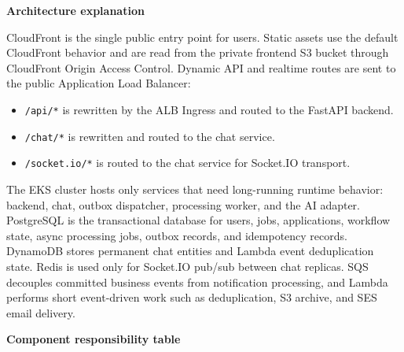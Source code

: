 \vspace{0.5em}\noindent\textbf{Architecture explanation}\par

CloudFront is the single public entry point for users. Static assets use
the default CloudFront behavior and are read from the private frontend
S3 bucket through CloudFront Origin Access Control. Dynamic API and
realtime routes are sent to the public Application Load Balancer:

\begin{itemize}
\tightlist
\item
  \texttt{/\allowbreak{}api/\allowbreak{}*} is rewritten by the ALB Ingress and routed to the
  FastAPI backend.
\item
  \texttt{/\allowbreak{}chat/\allowbreak{}*} is rewritten and routed to the chat service.
\item
  \texttt{/\allowbreak{}socket.\allowbreak{}io/\allowbreak{}*} is routed to the chat service for Socket.IO
  transport.
\end{itemize}

The EKS cluster hosts only services that need long-running runtime
behavior: backend, chat, outbox dispatcher, processing worker, and the
AI adapter. PostgreSQL is the transactional database for users, jobs,
applications, workflow state, async processing jobs, outbox records, and
idempotency records. DynamoDB stores permanent chat entities and Lambda
event deduplication state. Redis is used only for Socket.IO pub/sub
between chat replicas. SQS decouples committed business events from
notification processing, and Lambda performs short event-driven work
such as deduplication, S3 archive, and SES email delivery.

\vspace{0.5em}\noindent\textbf{Component responsibility
table}\par

